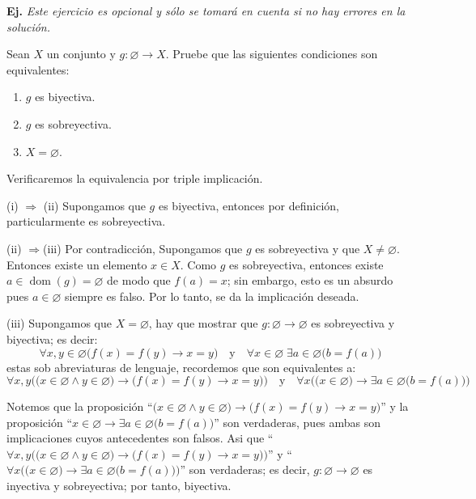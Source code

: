 \documentclass[letterpaper,DIV=14,headsepline,12pt]{scrartcl}
\makeatletter
\newcounter{Ejer}
\newcommand{\pts}{}
\newenvironment{ejercicio}[1]{\noindent
    \ifthenelse{\equal{#1}{1} \OR \equal{#1}{+1}}{\renewcommand{\pts}{\textbf{(#1 pt)}}}{\renewcommand{\pts}{\textbf{(#1 pts)}}}\textbf{Ej. \theEjer} \pts\stepcounter{Ejer}}{\vspace{.3cm}}
\renewcommand{\emptyset}{\varnothing}
\DeclareMathOperator{\dom}{dom}
\renewenvironment{proof}[1][]{%
        \par\pushQED{\qed}%
        \normalfont\topsep6pt \partopsep0pt %
        \trivlist
        \item[\hskip\labelsep
                \textbf{\textit{Demostración.}}%
        ]#1
        }{%
        \popQED\endtrivlist\@endpefalse
    }
\makeatother
\begin{document}
    \begin{ejercicio}{+1}
        \textit{Este ejercicio es opcional y sólo se tomará en cuenta si no hay 
        errores en la solución.}
            
        Sean $X$ un conjunto y $g\colon\emptyset \to X$. Pruebe que las siguientes condiciones son equivalentes:
        \begin{enumerate}
            \item $g$ es biyectiva.
            \item $g$ es sobreyectiva.
            \item $X=\emptyset$.
        \end{enumerate}
    \end{ejercicio}
    \begin{proof}
        Verificaremos la equivalencia por triple implicación.

        (i) $\Rightarrow$ (ii) Supongamos que $g$ es biyectiva, entonces por definición, particularmente es sobreyectiva.

        (ii) $\Rightarrow$(iii) Por contradicción, Supongamos que $g$ es sobreyectiva y que $X \neq \emptyset$. Entonces existe un elemento $x\in X$. Como $g$ es sobreyectiva, entonces existe $a \in \dom(g)=\emptyset$ de modo que $f(a)=x$; sin embargo, esto es un absurdo pues $a \in \emptyset$ siempre es falso. Por lo tanto, se da la implicación deseada.

        (iii) Supongamos que $X=\emptyset$, hay que mostrar que $g:\emptyset \to \emptyset$ es sobreyectiva y biyectiva; es decir:
        \[ \forall x,y \in \emptyset \big( f(x)=f(y) \to x=y \big) \quad \text{y} \quad \forall x \in \emptyset \; \exists a \in \emptyset \big( b=f(a) \big) \]
        estas sob abreviaturas de lenguaje, recordemos que son equivalentes a:
        \[ \forall x,y \Big( \big( x \in \emptyset \land y \in \emptyset \big) \to \big( f(x)=f(y) \to x=y \big) \Big) \quad \text{y} \quad \forall x \Big( \big( x \in \emptyset \big) \to \exists a \in \emptyset \big( b=f(a) \big) \Big) \]

        Notemos que la proposición ``$\big( x \in \emptyset \land y \in \emptyset \big) \to \big( f(x)=f(y) \to x=y \big)$'' y la proposición ``$x \in\emptyset \to \exists a \in \emptyset \big( b=f(a) \big)$'' son verdaderas, pues ambas son implicaciones cuyos antecedentes son falsos. Asi que ``$\forall x,y \big( \big( x \in \emptyset \land y \in \emptyset \big) \to \big( f(x)=f(y) \to x=y \big) \big)$'' y ``$\forall x \big( \big( x \in \emptyset \big) \to \exists a \in \emptyset \big( b=f(a) \big) \big) $'' son verdaderas; es decir, $g:\emptyset \to \emptyset$ es inyectiva y sobreyectiva; por tanto, biyectiva.
    \end{proof}
\end{document}
